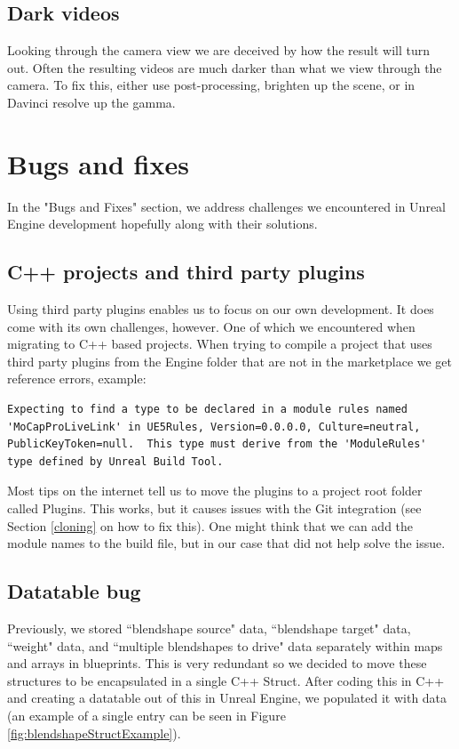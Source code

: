 \documentclass{uva-inf-article}
\begin{document}
\subsection{Dark videos}
Looking through the camera view we are deceived by how the result will turn out. Often the resulting videos are much darker than what we view through the camera. To fix this, either use post-processing, brighten up the scene, or in Davinci resolve up the gamma.


\section{Bugs and fixes}
In the "Bugs and Fixes" section, we address challenges we encountered in Unreal Engine development hopefully along with their solutions.

\subsection{C++ projects and third party plugins}\label{cppThirdPartyPluginsBug}
Using third party plugins enables us to focus on our own development. It does come with its own challenges, however. One of which we encountered when migrating to C++ based projects. When trying to compile a project that uses third party plugins from the Engine folder that are not in the marketplace we get reference errors, example:
\begin{lstlisting}
Expecting to find a type to be declared in a module rules named 'MoCapProLiveLink' in UE5Rules, Version=0.0.0.0, Culture=neutral, PublicKeyToken=null.  This type must derive from the 'ModuleRules' type defined by Unreal Build Tool.
\end{lstlisting}
Most tips on the internet tell us to move the plugins to a project root folder called Plugins. This works, but it causes issues with the Git integration (see Section \ref{cloning} on how to fix this). One might think that we can add the module names to the build file, but in our case that did not help solve the issue.

\subsection{Datatable bug}\label{datatableBug}
Previously, we stored ``blendshape source" data, ``blendshape target" data, ``weight" data, and ``multiple blendshapes to drive" data separately within maps and arrays in blueprints. This is very redundant so we decided to move these structures to be encapsulated in a single C++ Struct. After coding this in C++ and creating a datatable out of this in Unreal Engine, we populated it with data (an example of a single entry can be seen in Figure \ref{fig:blendshapeStructExample}).
\end{document}
